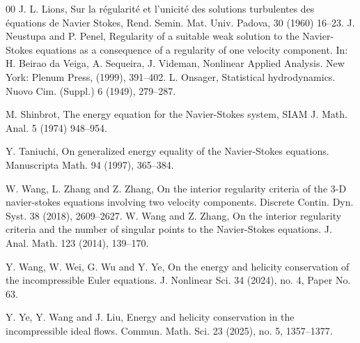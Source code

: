 \documentclass[11pt]{article}
\theoremstyle{plain}\newtheorem{definition}{Definition}[section]
\theoremstyle{definition}\newtheorem{theorem}{Theorem}[section]
\theoremstyle{plain}\newtheorem{lemma}[theorem]{Lemma}
\theoremstyle{plain}\newtheorem{coro}[theorem]{Corollary}
\theoremstyle{plain}\newtheorem{prop}[theorem]{Proposition}
\theoremstyle{remark}\newtheorem{remark}{Remark}[section]
\numberwithin{equation}{section}
\begin{document}
\begin{thebibliography}{00}
\bibitem{[Lions]}
J. L. Lions, Sur la r\'egularit\'e et l'unicit\'e des solutions turbulentes des \'equations de Navier Stokes, Rend. Semin. Mat. Univ. Padova, 30 (1960) 16--23.
\bibitem{[NP]}
J. Neustupa and P. Penel, Regularity of a suitable weak solution to the Navier-Stokes
equations as a consequence of a regularity of one velocity component. In: H. Beirao
da Veiga, A. Sequeira, J. Videman, Nonlinear Applied Analysis. New York: Plenum
Press, (1999), 391--402.
      \bibitem{[Onsager]}
L. Onsager,  Statistical hydrodynamics. Nuovo Cim. (Suppl.) 6 (1949), 279--287.


	\bibitem{[Shinbrot]}
M. Shinbrot, The energy equation for the Navier-Stokes system, SIAM J. Math. Anal. 5 (1974) 948--954.
			
\bibitem{[Taniuchi]}
 Y. Taniuchi, On generalized energy equality of the Navier-Stokes equations.
Manuscripta Math. 94 (1997), 365--384.

\bibitem{[WZZ]}
W. Wang, L. Zhang and Z. Zhang,
On the interior regularity criteria of the 3-D navier-stokes equations involving two velocity components. Discrete Contin. Dyn. Syst.
  38 (2018),   2609--2627.
\bibitem{[WZ]} W. Wang  and Z. Zhang, On the interior regularity criteria and the number of singular points to the Navier-Stokes
equations. J. Anal. Math. 123 (2014), 139--170.


\bibitem{[WWWY]}Y. Wang, W. Wei, G. Wu and Y. Ye, On the energy and helicity conservation of the incompressible Euler equations. J. Nonlinear Sci. 34 (2024), no. 4, Paper No. 63.






 \bibitem{[YWL]} Y. Ye,  Y. Wang and  J. Liu, Energy and helicity conservation in the incompressible ideal flows. Commun. Math. Sci. 23 (2025), no. 5, 1357--1377.


\end{thebibliography}
\end{document}
